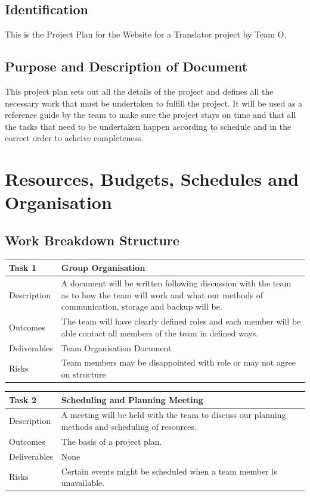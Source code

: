 \documentclass{l3proj}
\begin{document}
\subsection{Identification}
This is the Project Plan for the Website for a Translator project by Team O.

\subsection{Purpose and Description of Document}
This project plan sets out all the details of the project and defines all the necessary work that must be undertaken to 
fulfill the project. It will be used as a reference guide by the team to make sure the project stays on time and that all the tasks 
that need to be undertaken happen according to schedule and in the correct order to acheive completeness.

\section{Resources, Budgets, Schedules and Organisation}
\subsection{Work Breakdown Structure} 

\begin{center}
    \begin{tabular}{ | l | p{12cm} |}
    \hline	
    Task 1 & Group Organisation \\ \hline
    Description & A document will be written following discussion with the team as to how the
	team will work and what our methods of communication, storage and backup will be. \\ \hline   
    Outcomes & The team will have clearly defined roles and each member will be able contact all members of the team in defined ways. \\ \hline
    Deliverables & Team Organisation Document \\ \hline
    Risks & Team members may be disappointed with role or may not agree on structure \\ 
    \hline
    \end{tabular}
\end{center}

\begin{center}
    \begin{tabular}{ | l | p{12cm} |}
    \hline	
    Task 2 & Scheduling and Planning Meeting \\ \hline
    Description & A meeting will be held with the team to discuss our planning methods and scheduling of resources. \\ \hline   
    Outcomes & The basis of a project plan. \\ \hline
    Deliverables & None \\ \hline
    Risks & Certain events might be scheduled when a team member is unavailable. \\ 
    \hline
    \end{tabular}
\end{center}
\end{document}
